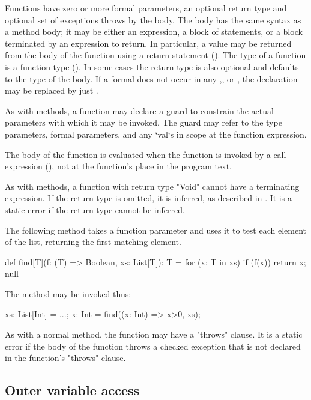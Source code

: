 Functions have zero or more formal parameters, an optional return type
and optional set of exceptions throws by the body.  The body has the
same syntax as a method body; it may be either an expression, a block
of statements, or a block terminated by an expression to return. In
particular, a value may be returned from the body of the function
using a return statement (). The type of a
function is a function type ().  In some cases the
return type  is also optional and defaults to the type of the
body. If a formal  does not occur in any
,, or , the declaration  may
be replaced by just .

\label{ClosureGuard}

As with methods, a function may declare a guard to
constrain the actual parameters with which it may be invoked.
The guard may refer to the type parameters, formal parameters,
and any \xcd`val`s in scope at the function expression.

The body of the function is evaluated when the function is
invoked by a call expression (), not at the function's
place in the program text.

As with methods, a function with return type \xcd"Void" cannot
have a terminating expression. 
If the return type is omitted, it is inferred, as described in
.
It is a static error if the return type cannot be inferred. 


\begin{example}
The following method takes a function parameter and uses it to
test each element of the list, returning the first matching
element.
\begin{xten}
def find[T](f: (T) => Boolean, xs: List[T]): T = {
  for (x: T in xs)
    if (f(x)) return x;
  null
}
\end{xten}

The method may be invoked thus:
\begin{xten}
xs: List[Int] = ...;
x: Int = find((x: Int) => x>0, xs);
\end{xten}
\end{example}

As with a normal method, the function may have a \xcd"throws"
clause. It is a static error if the body of the function throws a
checked exception that is not declared in the function's \xcd"throws"
clause.

\subsection{Outer variable access}

